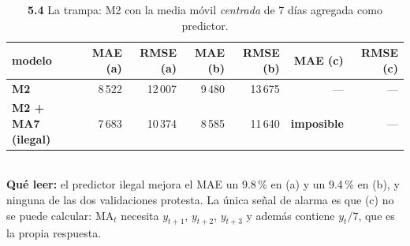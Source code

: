 \begin{table}[htbp]
\centering
\footnotesize
\caption{\textbf{5.4} La trampa: M2 con la media m\'ovil \emph{centrada} de 7 d\'ias agregada como predictor.}
\label{tab:p5_trampa}
\begin{tabular}{lrrrrrr}
\toprule
\textbf{modelo} & \textbf{MAE (a)} & \textbf{RMSE (a)} & \textbf{MAE (b)} & \textbf{RMSE (b)} & \textbf{MAE (c)} & \textbf{RMSE (c)} \\
\midrule
\textbf{M2} & 8\,522 & 12\,007 & 9\,480 & 13\,675 & --- & --- \\
\textbf{M2 + MA7 (ilegal)} & 7\,683 & 10\,374 & 8\,585 & 11\,640 & \textbf{imposible} & --- \\
\bottomrule
\end{tabular}
\\[0.3em]{\scriptsize \textbf{Qu\'e leer:} el predictor ilegal mejora el MAE un 9.8\,\% en (a) y un 9.4\,\% en (b), y ninguna de las dos validaciones protesta. La \'unica se\~nal de alarma es que (c) no se puede calcular: $\mathrm{MA}_t$ necesita $y_{t+1}$, $y_{t+2}$, $y_{t+3}$ y adem\'as contiene $y_t/7$, que es la propia respuesta.}
\end{table}
